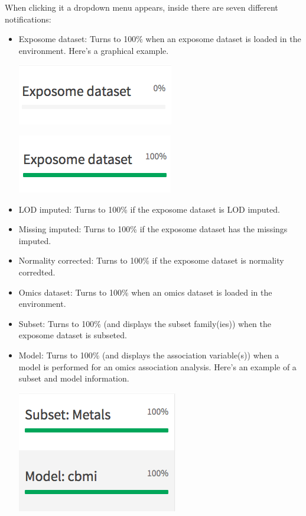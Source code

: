 \documentclass[
]{book}
\providecommand{\tightlist}{%
  \setlength{\itemsep}{0pt}\setlength{\parskip}{0pt}}
\begin{document}
When clicking it a dropdown menu appears, inside there are seven different notifications:

\begin{itemize}
\tightlist
\item
  Exposome dataset: Turns to 100\% when an exposome dataset is loaded in the environment. Here's a graphical example.

  \includegraphics{images/general2.png}

  \includegraphics{images/general3.png}
\item
  LOD imputed: Turns to 100\% if the exposome dataset is LOD imputed.
\item
  Missing imputed: Turns to 100\% if the exposome dataset has the missings imputed.
\item
  Normality corrected: Turns to 100\% if the exposome dataset is normality corredted.
\item
  Omics dataset: Turns to 100\% when an omics dataset is loaded in the environment.
\item
  Subset: Turns to 100\% (and displays the subset family(ies)) when the exposome dataset is subseted.
\item
  Model: Turns to 100\% (and displays the association variable(s)) when a model is performed for an omics association analysis. Here's an example of a subset and model information.

  \includegraphics{images/general4.png}
\end{itemize}

  
\end{document}
